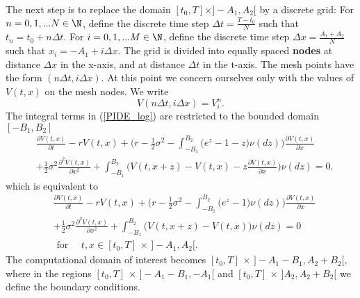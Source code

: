 The next step is to replace the domain $[t_0,T]\times ]-A_1,A_2[$ by a discrete grid:
For $n = 0,1, ... N \in \N$, define the discrete time step $ \Delta t = \frac{T - t_0}{N} $ such that
$t_n = t_0 + n \Delta t$. For $i = 0,1, ... M \in \N$, define the discrete time step $ \Delta x = \frac{A_1 + A_2}{N} $ such that
$x_i = -A_1 + i \Delta x$.
The grid is divided into equally spaced \textbf{nodes} at distance $\Delta x$ in the x-axis, and at distance $\Delta t$ in the t-axis.
The mesh points have the form $(n \Delta t, i \Delta x)$.
At this point we concern ourselves only with the values of $V(t,x)$ on the mesh nodes. We write 
$$ V(n \Delta t, i \Delta x) = V^n_i .$$
The integral terms in (\ref{PIDE_log}) are restricted to the bounded domain $[-B_1,B_2]$
\begin{align*}
&  \frac{\partial V(t,x)}{\partial t} - r V(t,x) 
          + \biggl( r -\frac{1}{2}\sigma^2 - \int_{-B_1}^{B_2} \bigl( e^z-1-z \bigr) \nu(dz) \biggr) \frac{\partial V(t,x)}{\partial x} \\ \nonumber
          &+ \frac{1}{2} \sigma^2 \frac{\partial^2 V(t,x)}{\partial x^2} 
          + \int_{-B_1}^{B_2} \bigl( V(t,x+z)- V(t,x) - z \frac{\partial V(t,x)}{\partial x} \bigr) \nu(dz)  = 0.
\end{align*}
which is equivalent to 
\begin{align}\label{restricted_domain}
&  \frac{\partial V(t,x)}{\partial t} - r V(t,x) 
          + \biggl( r -\frac{1}{2}\sigma^2 - \int_{-B_1}^{B_2} \bigl( e^z-1 \bigr) \nu(dz) \biggr) \frac{\partial V(t,x)}{\partial x} \\ \nonumber
          &+ \frac{1}{2} \sigma^2 \frac{\partial^2 V(t,x)}{\partial x^2} 
          + \int_{-B_1}^{B_2} \bigl( V(t,x+z)- V(t,x) \bigr) \nu(dz)  = 0 \\ \nonumber
          & \mbox{ for } \quad t,x \in [t_0,T]\, \times \, ]-A_1,A_2[.
\end{align}
The computational domain of interest becomes $[t_0,T]\, \times \, ]-A_1-B_1,A_2+B_2[$, where in the regions $[t_0,T]\, \times \, ]-A_1-B_1,-A_1[$ and 
$[t_0,T]\, \times \, ]A_2,A_2+B_2[$ we define the boundary conditions.

